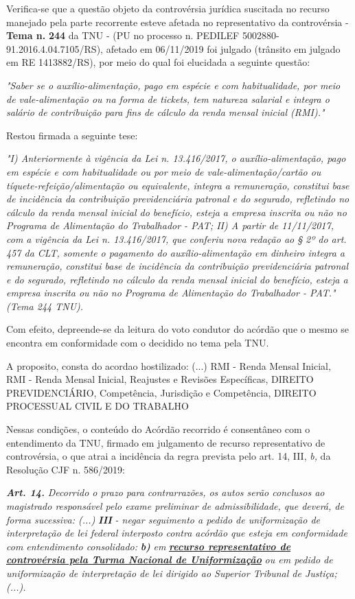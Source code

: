 \documentclass[12pt]{article}
\begin{document}
\justifying
\noindent Verifica-se que a questão objeto da controvérsia jurídica suscitada no recurso manejado pela parte recorrente esteve afetada no representativo da controvérsia - \textbf{Tema n. }\textbf{244} da TNU - (PU no processo n. PEDILEF 5002880-91.2016.4.04.7105/RS),  afetado em 06/11/2019 foi julgado (trânsito em julgado em RE 1413882/RS), por meio do qual foi elucidada a seguinte questão:

\noindent \textit{"Saber se o auxílio-alimentação, pago em espécie e com habitualidade, por meio de vale-alimentação ou na forma de tickets, tem natureza salarial e integra o salário de contribuição para fins de cálculo da renda mensal inicial (RMI)."}

\noindent Restou firmada a seguinte tese:

\noindent \textit{"I) Anteriormente à vigência da Lei n. 13.416/2017, o auxílio-alimentação, pago em espécie e com habitualidade ou por meio de vale-alimentação/cartão ou tíquete-refeição/alimentação ou equivalente, integra a remuneração, constitui base de incidência da contribuição previdenciária patronal e do segurado, refletindo no cálculo da renda mensal inicial do benefício, esteja a empresa inscrita ou não no Programa de Alimentação do Trabalhador - PAT; II) A partir de 11/11/2017, com a vigência da Lei n. 13.416/2017, que conferiu nova redação ao § 2º do art. 457 da CLT, somente o pagamento do auxílio-alimentação em dinheiro integra a remuneração, constitui base de incidência da contribuição previdenciária patronal e do segurado, refletindo no cálculo da renda mensal inicial do benefício, esteja a empresa inscrita ou não no Programa de Alimentação do Trabalhador - PAT." (Tema 244 TNU).}

\noindent Com efeito, depreende-se da leitura do voto condutor do acórdão que o mesmo se encontra em conformidade com o decidido no  tema pela TNU.

\noindent A proposito, consta do acordao hostilizado: (...) RMI - Renda Mensal Inicial, RMI - Renda Mensal Inicial, Reajustes e Revisões Específicas, DIREITO PREVIDENCIÁRIO, Competência, Jurisdição e Competência, DIREITO PROCESSUAL CIVIL E DO TRABALHO

\noindent Nessas condições, o conteúdo do Acórdão recorrido é consentâneo com o entendimento da TNU, firmado em julgamento de recurso representativo de controvérsia, o que atrai a incidência da regra prevista pelo art. 14, III, \textit{b,} da Resolução CJF n. 586/2019:

\noindent \textit{\textbf{Art. 14.}}\textit{ Decorrido o prazo para contrarrazões, os autos serão conclusos ao magistrado responsável pelo exame preliminar de admissibilidade, que deverá, de forma sucessiva: (...) }\textit{\textbf{III }}\textit{- negar seguimento a pedido de uniformização de interpretação de lei federal interposto contra acórdão que esteja em conformidade com entendimento consolidado: }\textit{\textbf{b)}}\textit{ em }\uline{\textit{\textbf{recurso representativo de controvérsia pela Turma Nacional de Uniformização}}}\textit{ ou em pedido de uniformização de interpretação de lei dirigido ao Superior Tribunal de Justiça;(...).}
\end{document}
